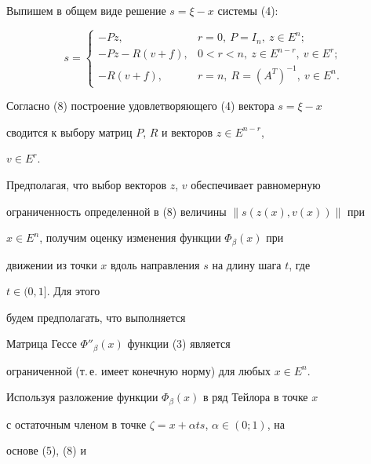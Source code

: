 Выпишем в общем виде решение $s=\xi-x$ системы (4): 


\begin{equation} 


s= 


\begin{cases} 


-P z, &r=0,\ P=I_n,\ z\in E^n;\\ 


-P z-R(v+f), & 0<r<n,\ z\in E^{n-r},\ v\in E^r;\\ 


-R(v+f), & r=n,\ R=(A^T)^{-1},\ v\in E^n. 


\end{cases} 


\end{equation} 


Согласно (8) построение удовлетворяющего (4) вектора $s=\xi-x$ 


сводится к выбору матриц $P$, $R$ и векторов $z\in E^{n-r}$, 


$v\in E^r$. 





Предполагая, что выбор векторов $z$, $v$ обеспечивает равномерную 


ограниченность определенной в (8) величины $\|s(z(x),v(x))\|$ при 


$x\in E^n$, получим оценку изменения функции $\Phi_\beta(x)$ при 


движении из точки $x$ вдоль направления $s$ на длину шага $t$, где 


$t\in(0,1]$. Для этого 


будем предполагать, что выполняется 


 


\begin{cond} Матрица Гессе $\Phi''_\beta(x)$ функции (3) является 


ограниченной (т.\,е.{} имеет конечную норму) для любых $x\in E^n$. 


\end{cond} 


 


Используя разложение функции $\Phi_\beta(x)$ в ряд Тейлора в точке $x$ 


с остаточным членом в точке $\zeta=x+\alpha ts$, $\alpha\in(0;1)$, на 


основе (5), (8) и 


